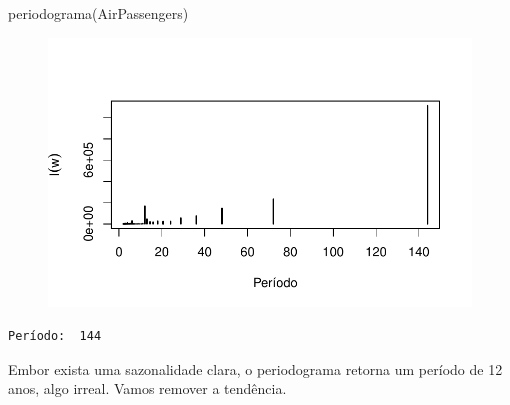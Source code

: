 \documentclass[
  letterpaper,
  DIV=11,
  numbers=noendperiod]{scrreprt}
\newenvironment{Shaded}{\begin{snugshade}}{\end{snugshade}}
\newcommand{\AttributeTok}[1]{\textcolor[rgb]{0.40,0.45,0.13}{#1}}
\newcommand{\CommentTok}[1]{\textcolor[rgb]{0.37,0.37,0.37}{#1}}
\newcommand{\DecValTok}[1]{\textcolor[rgb]{0.68,0.00,0.00}{#1}}
\newcommand{\FunctionTok}[1]{\textcolor[rgb]{0.28,0.35,0.67}{#1}}
\newcommand{\NormalTok}[1]{\textcolor[rgb]{0.00,0.23,0.31}{#1}}
\newcommand{\OtherTok}[1]{\textcolor[rgb]{0.00,0.23,0.31}{#1}}
\newcommand{\SpecialCharTok}[1]{\textcolor[rgb]{0.37,0.37,0.37}{#1}}
\begin{document}
\begin{Shaded}
\begin{Highlighting}[]
\FunctionTok{periodograma}\NormalTok{(AirPassengers)}
\end{Highlighting}
\end{Shaded}

\begin{figure}[H]

{\centering \includegraphics{ferramentas_files/figure-pdf/unnamed-chunk-13-2.pdf}

}

\end{figure}

\begin{verbatim}
Período:  144 
\end{verbatim}

Embor exista uma sazonalidade clara, o periodograma retorna um período
de 12 anos, algo irreal. Vamos remover a tendência.

\begin{Shaded}
\end{Shaded}
\end{document}
